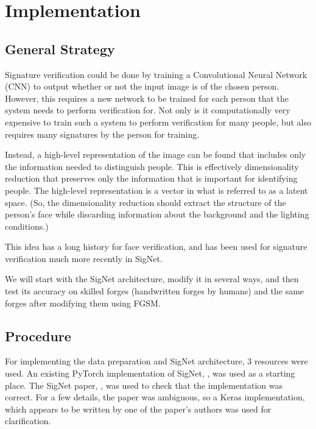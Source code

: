 \section{Implementation}\label{sec:implementation}


\subsection{General Strategy}

Signature verification could be done by training a Convolutional Neural Network (CNN) to output whether or not the input image is of the chosen person.
However, this requires a new network to be trained for each person that the system needs to perform verification for.
Not only is it computationally very expensive to train such a system to perform verification for many people, but also requires many signatures by the person for training.

Instead, a high-level representation of the image can be found that includes only the information needed to distinguish people.
This is effectively dimensionality reduction that preserves only the information that is important for identifying people.
The high-level representation is a vector in what is referred to as a latent space.
(So, the dimensionality reduction should extract the structure of the person's face while discarding information about the background and the lighting conditions.)

This idea has a long history for face verification\cite{LeCun}, and has been used for signature verification much more recently in SigNet\cite{sig_net}.

We will start with the SigNet architecture, modify it in several ways, and then test its accuracy on skilled forges (handwritten forges by humans) and the same forges after modifying them using FGSM.


\subsection{Procedure}

For implementing the data preparation and SigNet architecture, 3 resources were used.
An existing PyTorch implementation of SigNet, \cite{GitHub_signet_pytorch}, was used as a starting place.
The SigNet paper, \cite{sig_net}, was used to check that the implementation was correct.
For a few details, the paper was ambiguous, so a Keras implementation, \cite{GitHub_sounakdey} which appears to be written by one of the paper's authors was used for clarification.

